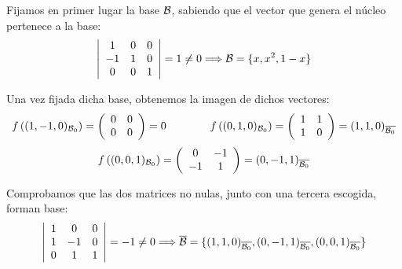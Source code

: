 \documentclass[12pt]{article}
\begin{document}
\begin{ejercicio}
    Fijamos en primer lugar la base $\mathcal{B}$, sabiendo que el vector que genera el núcleo pertenece a la base:
    \begin{equation*}
        \left|\begin{array}{ccc}
            1 & 0 & 0 \\
            -1 & 1 & 0 \\
            0 & 0 & 1
        \end{array}\right| = 1\neq 0 \Longrightarrow \mathcal{B}=\{x,x^2, 1-x\}
    \end{equation*}

    Una vez fijada dicha base, obtenemos la imagen de dichos vectores:
    \begin{equation*}
        f\left((1,-1,0)_{\mathcal{B}_0}\right)=\left(\begin{array}{cc}
            0 & 0 \\
            0 & 0
        \end{array}\right) = 0
        \qquad \qquad
        f\left((0,1,0)_{\mathcal{B}_0}\right)=\left(\begin{array}{cc}
            1 & 1 \\
            1 & 0
        \end{array}\right) = (1,1,0)_{\overline{\mathcal{B}_0}}
    \end{equation*}
    \begin{equation*}
        f\left((0,0,1)_{\mathcal{B}_0}\right)=\left(\begin{array}{cc}
            0 & -1 \\
            -1 & 1
        \end{array}\right) = (0,-1,1)_{\overline{\mathcal{B}_0}}
    \end{equation*}

    Comprobamos que las dos matrices no nulas, junto con una tercera escogida, forman base:
    \begin{equation*}
        \left|\begin{array}{ccc}
            1 & 0 & 0 \\
            1 & -1 & 0 \\
            0 & 1 & 1
        \end{array}\right| = -1\neq 0 \Longrightarrow \overline{\mathcal{B}}=\{(1,1,0)_{\overline{\mathcal{B}_0}}, (0,-1,1)_{\overline{\mathcal{B}_0}}, (0,0,1)_{\overline{\mathcal{B}_0}}\}
    \end{equation*}


\end{ejercicio}
\end{document}
